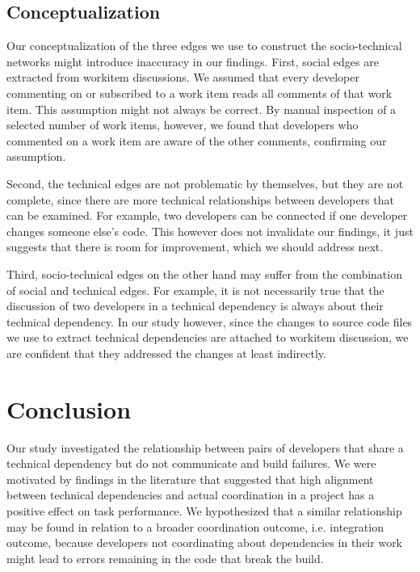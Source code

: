 \subsection{Conceptualization}
Our conceptualization of the three edges we use to construct the
socio-technical networks might introduce inaccuracy in our findings.
First, social edges are extracted from workitem discussions. We assumed that
every developer commenting on or subscribed to a work item reads all comments of that
work item. This assumption might not always be correct. By manual inspection of
a selected number of work items, however, we found that developers who
commented on a work item are aware of the other comments, confirming our assumption.

Second, the technical edges are not problematic by themselves, but they are not
complete, since there are more technical relationships between developers that
can be examined. For example, two developers can be connected if one developer
changes someone else's code. This however does not invalidate our findings, it
just suggests that there is room for improvement, which we should address
next.

Third, socio-technical edges on the other hand may suffer from the combination of
social and technical edges. For example, it is not necessarily true that the
discussion of  two developers in a technical dependency is always about their
technical dependency. 
In our study however, since the changes to
source code files we use to extract technical dependencies are attached to workitem discussion, we are
confident that they addressed the changes at least indirectly.



\section{Conclusion}
\label{sec:conclusions}
Our study investigated the relationship between pairs of developers that share
a technical dependency but do not communicate and build failures. We were
motivated by findings in the literature that suggested that high alignment between technical dependencies and actual coordination in a project has a positive effect on task
performance.
%
We hypothesized that a similar relationship may be found in relation to a broader
coordination outcome, i.e. integration outcome, because developers not
coordinating about dependencies in their work might lead to errors remaining in
the code that break the build.

